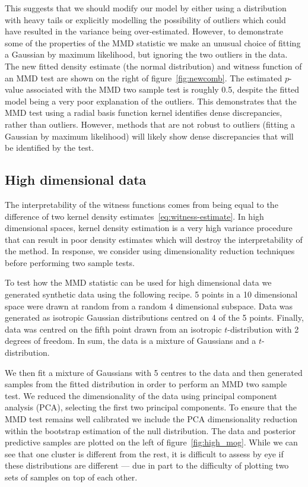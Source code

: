This suggests that we should modify our model by either using a distribution with heavy tails or explicitly modelling the possibility of outliers which could have resulted in the variance being over-estimated.
However, to demonstrate some of the properties of the MMD statistic we make an unusual choice of fitting a Gaussian by maximum likelihood, but ignoring the two outliers in the data.
The new fitted density estimate (the normal distribution) and witness function of an MMD test are shown on the right of figure~\ref{fig:newcomb}.
The estimated $p$-value associated with the MMD two sample test is roughly 0.5, despite the fitted model being a very poor explanation of the outliers.
This demonstrates that the MMD test using a radial basis function kernel identifies dense discrepancies, rather than outliers.
However, methods that are not robust to outliers (\eg fitting a Gaussian by maximum likelihood) will likely show dense discrepancies that will be identified by the test.

\subsection{High dimensional data}

\label{sec:high_dim}

The interpretability of the witness functions comes from being equal to the difference of two kernel density estimates~\eqref{eq:witness-estimate}.
In high dimensional spaces, kernel density estimation is a very high variance procedure that can result in poor density estimates which will destroy the interpretability of the method.
In response, we consider using dimensionality reduction techniques before performing two sample tests.

To test how the MMD statistic can be used for high dimensional data we generated synthetic data using the following recipe.
5 points in a 10 dimensional space were drawn at random from a random 4 dimensional subspace\footnotemark.
Data was generated as isotropic Gaussian distributions centred on 4 of the 5 points.
Finally, data was centred on the fifth point drawn from an isotropic $t$-distribution with 2 degrees of freedom.
In sum, the data is a mixture of Gaussians and a $t$-distribution.

We then fit a mixture of Gaussians \citep[e.g.][]{McLachlan2004-qz} with 5 centres to the data and then generated samples from the fitted distribution in order to perform an MMD two sample test.
We reduced the dimensionality of the data using principal component analysis (PCA), selecting the first two principal components.
To ensure that the MMD test remains well calibrated we include the PCA dimensionality reduction within the bootstrap estimation of the null distribution.
The data and posterior predictive samples are plotted on the left of figure~\ref{fig:high_mog}.
While we can see that one cluster is different from the rest, it is difficult to assess by eye if these distributions are different --- due in part to the difficulty of plotting two sets of samples on top of each other.

